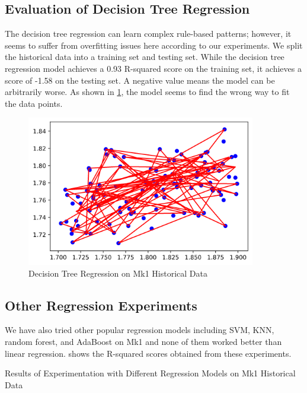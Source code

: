 \documentclass[a4paper]{article}
\begin{document}
\subsection{Evaluation of Decision Tree Regression}
The decision tree regression can learn complex rule-based patterns; however, it
seems to suffer from overfitting issues here according to our experiments.
We split the historical data into a training set and testing set.
While the decision tree regression model achieves a 0.93 R-squared score on the
training set, it achieves a score of -1.58 on the testing set.
A negative value means the model can be arbitrarily worse.
As shown in \cref{fig:decisiontree-mk1}, the model seems to find the wrong way
to fit the data points.

\begin{figure}[H]
  \centering
  \includegraphics[width=10cm]{decisiontree-mk1}
  \caption{Decision Tree Regression on Mk1 Historical Data}%
  \label{fig:decisiontree-mk1}
\end{figure}

\subsection{Other Regression Experiments}
We have also tried other popular regression models including SVM, KNN, random
forest, and AdaBoost on Mk1 and none of them worked better than linear
regression.
 shows the R-squared scores obtained from
these experiments.

\begin{table}[H]
  \centering
  
  \caption{Results of Experimentation with Different Regression Models on Mk1
  Historical Data}%
  \label{table:regression_experiments}
\end{table}
\end{document}
